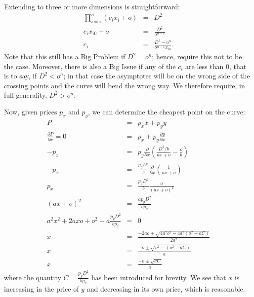\documentclass[12pt]{book}
\begin{document}
Extending to three or more dimensions is straightforward:
\begin{eqnarray*}
\prod_{i=i}^{n}(c_ix_i + o) &=& D^2\\
c_ix_{i0} + o &=& \frac{D^2}{o^{n-1}}\\
c_i &=& \frac{D^2-o^n}{o^{n-1}x_{i0}}.
\end{eqnarray*}
Note that this still has a Big Problem if $D^2=o^n$; hence, require this
not to be the case. Moreover, there is also a Big Issue if any of the
$c_i$ are less than 0, that is to say, if $D^2<o^n$; in that case the
asymptotes will be on the wrong side of the crossing points and the
curve will bend the wrong way. We therefore require, in full
generality, $D^2>o^n$.

Now, given prices $p_x$ and $p_y$, we can determine the cheapest point
on the curve:
\begin{eqnarray*}
P &=& p_xx + p_yy\\
\frac{\partial P}{\partial x} = 0 &=& p_x + p_y\frac{\partial y}{\partial x}\\
-p_x &=& p_y\frac{\partial }{\partial x}\left(\frac{D^2/b}{ax+o}-\frac{o}{b}\right)\\
-p_x &=& \frac{p_yD^2}{b}\frac{\partial }{\partial x}\left(\frac{1}{ax+o}\right)\\
p_x &=& \frac{p_yD^2}{b}\frac{a}{(ax+o)^2}\\
(ax+o)^2 &=& \frac{ap_yD^2}{bp_x}\\
a^2x^2 + 2axo + o^2 - a\frac{p_yD^2}{bp_x} &=& 0 \\
x &=& \frac{-2ao\pm\sqrt{4a^2o^2 - 4a^2(o^2 - aC)}}{2a^2} \\
x &=& \frac{-o\pm\sqrt{o^2 - (o^2 - aC)}}{a} \\
x &=& \frac{-o\pm\sqrt{aC}}{a}
\end{eqnarray*}
where the quantity $C = \frac{p_yD^2}{bp_x}$ has been
introduced for brevity. We see that $x$ is increasing in the price of
$y$ and decreasing in its own price, which is reasonable.
\end{document}
